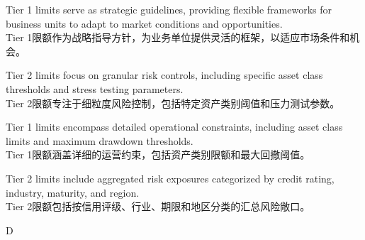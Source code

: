 \documentclass{article}
\begin{document}
            \begin{choices}
                \item Tier 1 limits serve as strategic guidelines, providing flexible frameworks for business units to adapt to market conditions and opportunities.\\
                Tier 1限额作为战略指导方针，为业务单位提供灵活的框架，以适应市场条件和机会。
                
                \item Tier 2 limits focus on granular risk controls, including specific asset class thresholds and stress testing parameters.\\
                Tier 2限额专注于细粒度风险控制，包括特定资产类别阈值和压力测试参数。
                
                \item Tier 1 limits encompass detailed operational constraints, including asset class limits and maximum drawdown thresholds.\\
                Tier 1限额涵盖详细的运营约束，包括资产类别限额和最大回撤阈值。
                
                \item Tier 2 limits include aggregated risk exposures categorized by credit rating, industry, maturity, and region.\\
                Tier 2限额包括按信用评级、行业、期限和地区分类的汇总风险敞口。
            \end{choices}
                
            \begin{correctanswer}
                D
            \end{correctanswer}
                
\end{document}
